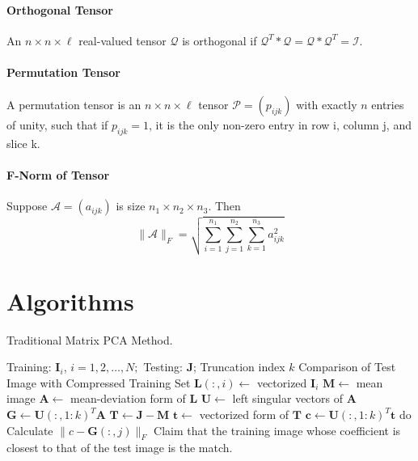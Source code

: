 \documentclass[english]{article}
\newcommand{\<}{\langle}
\renewcommand{\>}{\rangle}
\theoremstyle{definition}
\begin{document}
\paragraph{Orthogonal Tensor} An $ n \times n \times \ell $ real-valued tensor $ \mathcal{Q} $ is orthogonal if $ \mathcal{Q}^{T} * \mathcal{Q}= \mathcal{Q} * \mathcal{Q}^{T}=\mathcal{I}$.
\paragraph{Permutation Tensor} A permutation tensor is an $ n \times n \times \ell $ tensor  $\mathcal{P}=\left(p_{i j k}\right)$  with exactly $ n $ entries of unity, such that if  $p_{i j k}=1$,  it is the only non-zero entry in row i, column j, and slice k.
\paragraph{F-Norm of Tensor} Suppose $\mathcal{A}=\left(a_{i j k}\right)$ is size $ n_{1} \times n_{2} \times n_{3} $.  Then
$$ \|\mathcal{A}\|_{F}=\sqrt{\sum_{i=1}^{n_{1}} \sum_{j=1}^{n_{2}} \sum_{k=1}^{n_{3}} a_{i j k}^{2}} $$

\section{Algorithms}
\begin{algorithm}  
	\caption{Traditional Matrix PCA Method.}
	\begin{algorithmic} 
		\Require  
		Training:  $\mathbf{I}_{i}$, $i=1,2, \ldots, N; $ Testing: $ \mathbf{J}$;  Truncation index $ k $
		\Ensure  
		Comparison of Test Image with Compressed Training Set  
		\State $ \mathbf{L}(:, i) \leftarrow $ vectorized $ \mathbf{I}_{i} $
		\EndFor
		\State $ \mathbf{M} \leftarrow $ mean image
		\State $ \mathbf{A} \leftarrow $ mean-deviation form of $ \mathbf{L}  $
		\State $ \mathbf{U} \leftarrow $ left singular vectors of $ \mathbf{A} $  
		\State $\mathbf{G} \leftarrow \mathbf{U}(:, 1: k)^{T} \mathbf{A} $
		\State $ \mathbf{T} \leftarrow \mathbf{J}-\mathbf{M} $
		\State $ \mathbf{t} \leftarrow $ vectorized form of $ \mathbf{T} $  
		\State $ \mathbf{c} \leftarrow \mathbf{U}(:, 1: k)^{T} \mathbf{t}  $
		\State do Calculate $ \|c-\mathbf{G}(:, j)\|_{F}$
		\EndFor
		\State Claim that the training image whose coefficient is closest to that of the test image is the match. 
	\end{algorithmic}
\end{algorithm}  
\end{document}
